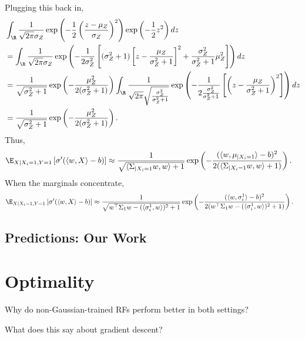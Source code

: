 \documentclass[usletter,twoside,12pt]{book}
\begin{document}
Plugging this back in,
\begin{align}
   &\int_{\R} \frac{1}{\sqrt{2 \pi} \sigma_Z} \exp\left( -\frac{1}{2} \left( \frac{z - \mu_Z}{\sigma_Z} \right)^2 \right) \exp\left( -\frac{1}{2} z^2 \right) dz \\
   &= \int_{\R} \frac{1}{\sqrt{2 \pi} \sigma_Z} \exp\left( -\frac{1}{2 \sigma_Z^2} \left[ (\sigma_Z^2 + 1) \left[ z - \frac{ \mu_Z }{ \sigma_Z^2 + 1 } \right]^2 + \frac{ \sigma_Z^2 }{ \sigma_Z^2 + 1 } \mu_Z^2 \right] \right) dz \\
   &= \frac{1}{\sqrt{\sigma_Z^2 + 1}} \exp\left( -\frac{ \mu_Z^2 }{ 2 (\sigma_Z^2 + 1) } \right) \int_{\R} \frac{1}{\sqrt{2 \pi} \sqrt{ \frac{\sigma_Z^2}{\sigma_Z^2 + 1} }} \exp\left( -\frac{1}{2 \frac{\sigma_Z^2}{\sigma_Z^2 + 1} } \left[ \left( z - \frac{ \mu_Z }{ \sigma_Z^2 + 1 } \right)^2 \right] \right) dz \\
   &= \frac{1}{\sqrt{\sigma_Z^2 + 1}} \exp\left( -\frac{ \mu_Z^2 }{ 2 (\sigma_Z^2 + 1) } \right).
\end{align}
Thus,
\begin{align}
   \E_{X \mid X_i=1, Y=1} \left[ \sigma'( \langle w, X \rangle - b ) \right]
   &\approx \frac{1}{\sqrt{\langle \Sigma_{\mid X_i=1} w, w \rangle + 1}} \exp\left( -\frac{ (\langle w, \mu_{\mid X_i=1} \rangle - b)^2 }{ 2 (\langle \Sigma_{\mid X_i=1} w, w \rangle + 1) } \right).
\end{align}
When the marginals concentrate,
\begin{align}
   \E_{X \mid X_i=1, Y=1} \left[ \sigma'( \langle w, X \rangle - b ) \right]
   &\approx \frac{1}{\sqrt{ w^\top \Sigma_1 w - ( \langle \sigma_i^1, w \rangle )^2 + 1}} \exp\left( -\frac{ (\langle w, \sigma_i^1 \rangle - b)^2 }{ 2 (w^\top \Sigma_1 w - ( \langle \sigma_i^1, w \rangle )^2 + 1) } \right).
\end{align}



\section{Predictions: Our Work}


\chapter{Optimality}

Why do non-Gaussian-trained RFs perform better in both settings?

What does this say about gradient descent?
\end{document}
